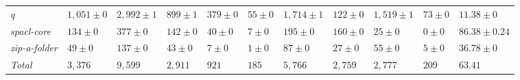 \begin{table}
{\begin{tabular}[t]{lllllllllll}
\textit{q} & $1,051 \pm 0$ & $2,992 \pm 1$ & $899 \pm 1$ & $379 \pm 0$ & $55 \pm 0$ & $1,714 \pm 1$ & $122 \pm 0$ & $1,519 \pm 1$ & $73 \pm 0$ & $11.38 \pm 0$\\
\textit{spacl-core} & $134 \pm 0$ & $377 \pm 0$ & $142 \pm 0$ & $40 \pm 0$ & $7 \pm 0$ & $195 \pm 0$ & $160 \pm 0$ & $25 \pm 0$ & $0 \pm 0$ & $86.38 \pm 0.24$\\
\textit{zip-a-folder} & $49 \pm 0$ & $137 \pm 0$ & $43 \pm 0$ & $7 \pm 0$ & $1 \pm 0$ & $87 \pm 0$ & $27 \pm 0$ & $55 \pm 0$ & $5 \pm 0$ & $36.78 \pm 0$\\
\hline\textit{Total} & $3,376$ & $9,599$ & $2,911$ & $921$ & $185$ & $5,766$ & $2,759$ & $2,777$ & $209$ & $63.41$\\
\bottomrule
\end{tabular}}
\end{table}
